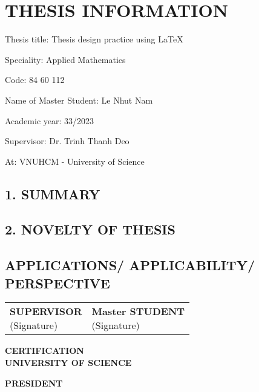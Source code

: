 \chapter*{THESIS INFORMATION}

\begin{flushleft}
Thesis title: Thesis design practice using \LaTeX

Speciality: Applied Mathematics

Code: 84 60 112

Name of Master Student: Le Nhut Nam

Academic year: 33/2023

Supervisor: Dr. Trinh Thanh Deo

At: VNUHCM - University of Science
\end{flushleft}

\section*{1. SUMMARY}
\lipsum[1-2]

\section*{2. NOVELTY OF THESIS}
\lipsum[1-2]

\section*{APPLICATIONS/ APPLICABILITY/ PERSPECTIVE}
\lipsum[1-1]

\vspace{4\baselineskip}
\begin{table}[H]
\begin{adjustbox}{max width =\textwidth}
\begin{tabular}{p{8.44cm}p{8.4cm}}
\multicolumn{1}{p{8.44cm}}{
\centering \textbf{SUPERVISOR} \newline
\centering
(Signature) \newline
} &
\multicolumn{1}{p{8.4cm}}{
\centering \textbf{Master STUDENT} \newline
\centering
(Signature) \newline
} \\
\end{tabular}
\end{adjustbox}
\end{table}
\vspace{2\baselineskip}
\begin{center}
    \textbf{CERTIFICATION \\ UNIVERSITY OF SCIENCE}
\end{center}
\begin{center}
    \textbf{PRESIDENT}
\end{center}